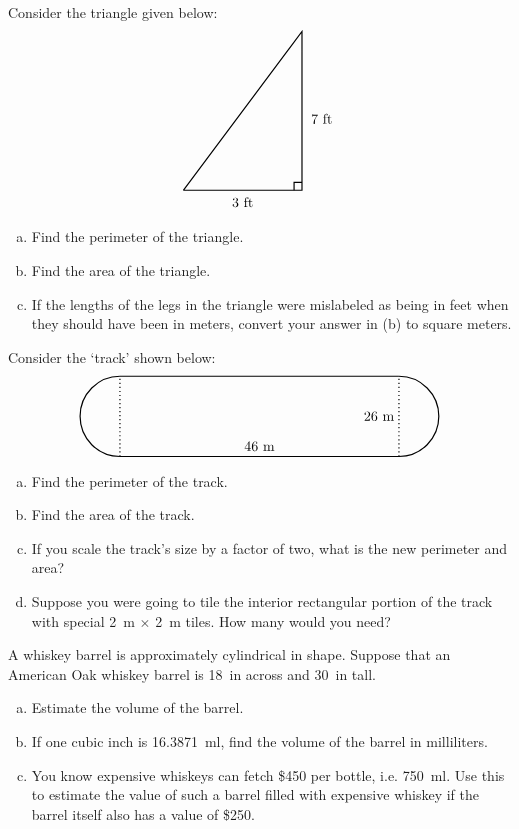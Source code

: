 \documentclass[11pt,letterpaper]{article}
\begin{document}

 Consider the triangle given below:
	\[
	\begin{tikzpicture}
	\draw[line width=0.03cm] (0,0) -- (3,0) -- (3,4) -- (0,0);
	\draw[line width=0.03cm] (2.8,0) -- (2.8,0.2) -- (3,0.2);
	\node at (1.5,-0.3) {$3$~ft};
	\node at (3.5,1.8) {$7$~ft};
	\end{tikzpicture}
	\]

\begin{enumerate}[(a)]
\item Find the perimeter of the triangle.
\item Find the area of the triangle. 
\item If the lengths of the legs in the triangle were mislabeled as being in feet when they should have been in meters, convert your answer in (b) to square meters. 
\end{enumerate}



\newpage



 Consider the `track' shown below:
	\[
	\begin{tikzpicture}
	\draw[line width=0.03cm] (0,0) -- (7,0);
	\draw[line width=0.03cm] (0,2) -- (7,2);
	
	\draw[line width=0.03cm,dotted] (0,0) -- (0,2);
	\draw[line width=0.03cm,dotted] (7,0) -- (7,2);
	 
	\draw[line width=0.03cm] (0,2) arc(90:270:1);
	\draw[line width=0.03cm] (7,0) arc(270:450:1);
	
	\node at (3.5,0.25) {$46$~m};
	\node at (6.5,1) {$26$~m};
	\end{tikzpicture}
	\]

\begin{enumerate}[(a)]
\item Find the perimeter of the track.
\item Find the area of the track.
\item If you scale the track's size by a factor of two, what is the new perimeter and area?
\item Suppose you were going to tile the interior rectangular portion of the track with special 2~m $\times$ 2~m tiles. How many would you need?
\end{enumerate}



\newpage



 A whiskey barrel is approximately cylindrical in shape. Suppose that an American Oak whiskey barrel is 18~in across and 30~in tall.
	\begin{enumerate}[(a)]
	\item Estimate the volume of the barrel. 
	\item If one cubic inch is 16.3871~ml, find the volume of the barrel in milliliters. 
	\item You know expensive whiskeys can fetch \$450 per bottle, i.e. 750~ml. Use this to estimate the value of such a barrel filled with expensive whiskey if the barrel itself also has a value of \$250.
	\end{enumerate}
\end{document}
